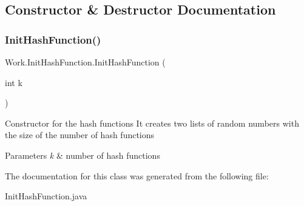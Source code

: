 \subsection{Constructor \& Destructor Documentation}
\mbox{\label{classWork_1_1InitHashFunction_a566c4124d9c94ca4a2afc714c1d92eac}} 
\subsubsection{\texorpdfstring{Init\+Hash\+Function()}{InitHashFunction()}}
{\footnotesize\ttfamily Work.\+Init\+Hash\+Function.\+Init\+Hash\+Function (\begin{DoxyParamCaption}\item[{int}]{k }\end{DoxyParamCaption})\hspace{0.3cm}{\ttfamily [inline]}}

Constructor for the hash functions It creates two lists of random numbers with the size of the number of hash functions 
\begin{DoxyParams}{Parameters}
{\em k} & number of hash functions \\
\hline
\end{DoxyParams}


The documentation for this class was generated from the following file\+:\begin{DoxyCompactItemize}
\item 
Init\+Hash\+Function.\+java\end{DoxyCompactItemize}

